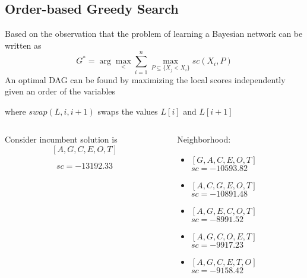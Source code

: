 \subsection{Order-based Greedy Search}

\begin{frame}
	Based on the observation that the problem of learning a Bayesian network can be written as
		\[ G^* = \arg \max_{<} \sum_{i=1}^{n} \max_{P \subseteq \{ X_j < X_i \}} {sc}( X_i , P ) \]
	An optimal DAG can be found by maximizing the local scores \alert{independently} given an order of the variables
\end{frame}
	
\begin{frame}
	
	where ${swap}( L , i , i + 1 )$ swaps the values $L[ i ]$ and $L[ i + 1 ]$
\end{frame}
	
\begin{frame}[fragile]
	\begin{columns}
		\begin{column}{.5\linewidth}
			Consider incumbent solution is
				\[ [ A , G , C , E , O , T ] \]
			\begin{figure}
				\centering
				
			\end{figure}
			\[ {sc} = -13192.33 \]
		\end{column}
		\begin{column}{.4\linewidth}
			Neighborhood:
			\begin{itemize}
				\item $[ G , A , C , E , O , T ]$\\$sc = -10593.82$
				\item $[ A , C , G , E , O , T ]$\\$sc = -10891.48$
				\item \alert{$[ A , G , E , C , O , T ]$\\$sc = -8991.52$}
				\item $[ A , G , C , O , E , T ]$\\$sc = -9917.23$
				\item $[ A , G , C , E , T , O ]$\\$sc = -9158.42$
			\end{itemize}
		\end{column}
	\end{columns}
\end{frame}
	
